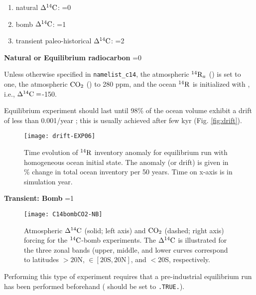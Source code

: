 \documentclass[../main/TOP_manual]{subfiles}
\begin{document}
\begin{enumerate}
\item natural                    $\Delta ^{14}\mathrm{C}$: =0
\item bomb                       $\Delta ^{14}\mathrm{C}$: =1
\item transient paleo-historical $\Delta ^{14}\mathrm{C}$: =2
\end{enumerate}

% 
\textbf{Natural or Equilibrium radiocarbon}
=0

Unless otherwise specified in \texttt{namelist\_c14}, the atmospheric $\mathrm{^{14}{R}}_a$ () is set to one, the atmospheric $\mathrm{CO_2}$ () to 280 ppm, and the ocean $\mathrm{^{14}{R}}$ is initialized with , i.e., $\Delta ^{14}\mathrm{C}=$-150\textperthousand \cite[typical for deep-ocean, Fig 6 in][]{key_2004}.

Equilibrium experiment should last until 98\% of the ocean volume exhibit a drift of less than 0.001\textperthousand/year \citep{orr_2000}; this is usually achieved after few kyr (Fig. \autoref{fig:drift}).
%

\begin{figure}[!h]
\begin{center}
\texttt{[image: drift-EXP06]}
\end{center}
\vspace{-4ex}
\caption{ Time evolution of $\mathrm{^{14}{R}}$ inventory anomaly for equilibrium run with homogeneous ocean initial state.
The anomaly (or drift) is given in \%  change in total ocean inventory per 50 years.
Time on x-axis is in simulation year.\label{fig:drift} }
\end{figure}

\textbf{Transient: Bomb}
\label{sec:bomb}
=1

\begin{figure}[!h]
\begin{center}
\texttt{[image: C14bombCO2-NB]}
\end{center}
\vspace{-4ex}
\caption{Atmospheric $\Delta ^{14}\mathrm{C}$ (solid; left axis) and $\mathrm{CO_2}$ (dashed; right axis)  forcing for the $\mathrm{^{14}C}$-bomb experiments.
The $\Delta ^{14}\mathrm{C}$ is illustrated for the three zonal bands (upper, middle, and lower curves correspond to latitudes $> 20$N, $\in [20\mathrm{S},20\mathrm{N}]$, and $< 20$S, respectively.} \label{fig:bomb}
\end{figure}

Performing this type of experiment requires that a pre-industrial equilibrium run has been performed beforehand ( should be set to \texttt{.TRUE.}).
\end{document}
